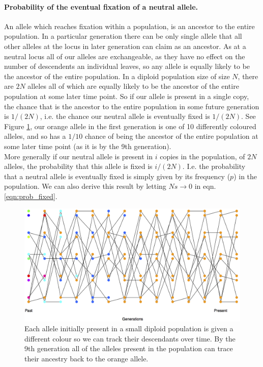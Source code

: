 \paragraph{Probability of the eventual fixation of a neutral allele.} An allele which reaches fixation within a population, is an ancestor to
the entire population. In a particular generation there can be only single
allele that all other alleles at the locus in  later generation can claim as an
ancestor. As at a neutral locus all of our alleles are exchangeable, as
they have no effect on the number of descendents an individual
leaves, so any allele is equally likely to be the ancestor of the
entire population.  In a diploid population size of size $N$, there are $2N$
alleles all of which are equally likely to be the ancestor of the
entire population at some later time point. So if our allele is present in a single copy, the chance that
is the ancestor to the entire population in some future generation is
$1/(2N)$, i.e. the chance our neutral allele is eventually fixed is
$1/(2N)$. See Figure \ref{fig:subs_simulation}, our orange allele in
the first generation is one of 10 differently coloured alleles, 
and so has a $1/10$ chance of being  the ancestor of the entire
population at some later time point (as it is by the 9th generation).\\

More generally if our neutral allele is present in $i$ copies in the
population, of $2N$ alleles, the probability that this allele is fixed
is $i/(2N)$. I.e. the probability that a neutral allele is eventually
fixed is simply given by its frequency ($p$) in the population.
We can also derive this result by letting $Ns \rightarrow
0$ in eqn. \eqref{eqn:prob_fixed}.

\begin{figure}
\begin{center}
  \includegraphics[width = \textwidth]{figures/Substitution_sim.png}
\end{center}
\caption{Each allele initially present in a small diploid population is
  given a different colour so we can track their descendants over
  time. By the 9th generation all of the alleles present in the
  population can trace their ancestry back to the orange allele.} \label{fig:subs_simulation}
\end{figure}

